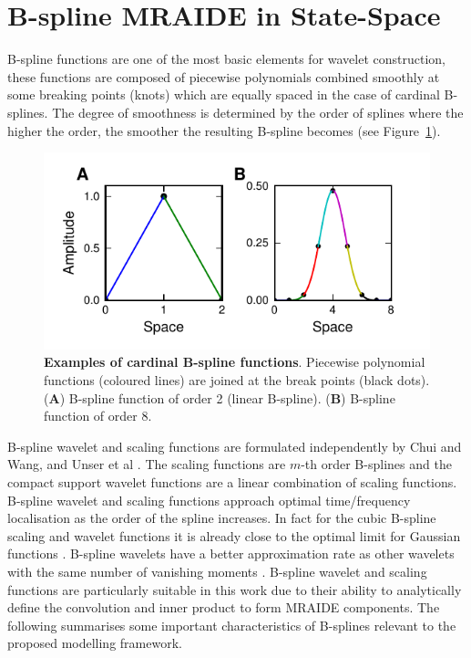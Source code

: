 \documentclass[11pt,draftcls,onecolumn,peerreview]{IEEEtran}
\begin{document}
\section{B-spline MRAIDE in State-Space }
B-spline functions are one of the most basic elements for wavelet construction, these functions are composed of  piecewise polynomials combined smoothly at some breaking points (knots) which are equally spaced in the case of cardinal B-splines. The degree of smoothness is determined by the order of splines \cite{Goswami1999} where the higher the order, the smoother the resulting B-spline becomes (see Figure~\ref{fig:Figure0}).
\begin{figure}[!ht]
\centering
\includegraphics{./Graph/Figure0.pdf}
\caption{{\bf Examples of cardinal B-spline functions}. Piecewise polynomial functions (coloured lines) are joined at the break points (black dots). (\textbf{A}) B-spline function of order 2 (linear B-spline). (\textbf{B}) B-spline function of order 8.}
\label{fig:Figure0}
\end{figure}
 
B-spline wavelet and scaling functions are formulated independently by Chui and Wang, and Unser et al \cite{Chui1992b,Chui1992,Unser1993}.  The scaling functions are $m$-th order B-splines and the compact support wavelet functions are a linear combination of scaling functions. B-spline wavelet and scaling functions approach optimal time/frequency localisation as the order of the spline increases. In fact for the cubic B-spline scaling and wavelet functions it is already close to the optimal limit for Gaussian functions \cite{Unser1992}. B-spline wavelets have a better approximation rate as other wavelets with the same number of vanishing moments \cite{Unser1999}. B-spline wavelet and scaling functions are particularly suitable in this work due to their ability to analytically define the convolution and inner product to form  MRAIDE components. The following summarises some important characteristics of B-splines relevant to the proposed modelling framework. 
\end{document}
